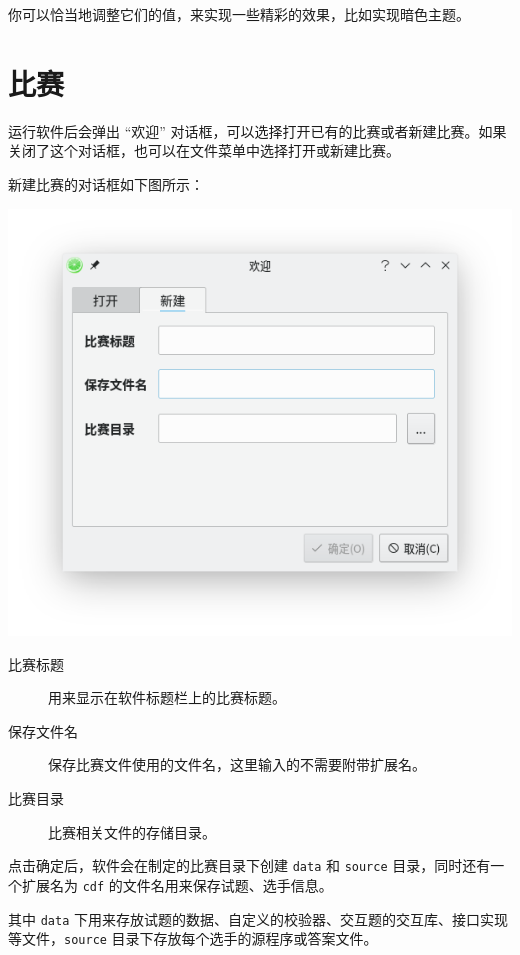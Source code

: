 \documentclass[UTF-8]{ctexart}
\begin{document}
				你可以恰当地调整它们的值，来实现一些精彩的效果，比如实现暗色主题。

		\newpage


		\section{比赛}

			运行软件后会弹出 “欢迎” 对话框，可以选择打开已有的比赛或者新建比赛。如果关闭了这个对话框，也可以在文件菜单中选择打开或新建比赛。

			新建比赛的对话框如下图所示：

			\begin{center}
			\includegraphics[scale=0.7]{pics/newcontest.png}
			\end{center}

			\begin{description}
				\item[比赛标题] 用来显示在软件标题栏上的比赛标题。
				\item[保存文件名] 保存比赛文件使用的文件名，这里输入的不需要附带扩展名。
				\item[比赛目录] 比赛相关文件的存储目录。
			\end{description}

			点击确定后，软件会在制定的比赛目录下创建 \texttt{data} 和 \texttt{source} 目录，同时还有一个扩展名为 \texttt{cdf} 的文件名用来保存试题、选手信息。

			其中 \texttt{data} 下用来存放试题的数据、自定义的校验器、交互题的交互库、接口实现等文件，\texttt{source} 目录下存放每个选手的源程序或答案文件。
\end{document}
